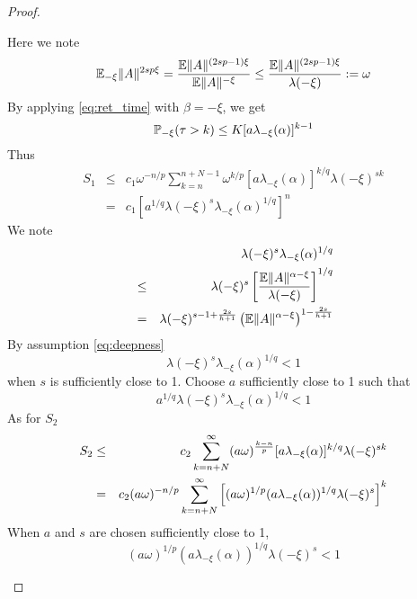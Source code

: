 \documentclass{article}
\theoremstyle{remark}
\begin{document}
\begin{proof}
\begin{enumerate}
\begin{enumerate}
      Here we note
      \begin{eqnarray*}
        \E_{-\xi} \|A\|^{2sp\xi} = {
          \E \|A\|^{(2sp-1)\xi}
          \over
          \E \|A\|^{-\xi}
        } \leq {
          \E \|A\|^{(2sp-1)\xi}
          \over
          \lambda(-\xi)
        } := \omega
      \end{eqnarray*}
      By applying \eqref{eq:ret_time} with $\beta = -\xi$, we get
      \[
      \P_{-\xi}(\tau > k) \leq K [a \lambda_{-\xi}(\alpha)]^{k-1}
      \]
      Thus
      \begin{eqnarray*}
        S_1 &\leq& c_1 \omega^{-n/p}
        \sum_{k=n}^{n+N-1} \omega^{k/p}
        [a \lambda_{-\xi}(\alpha)]^{k/q}
        \lambda(-\xi)^{sk} \\
        &=& c_1 \left[
          a^{1/q} \lambda(-\xi)^s \lambda_{-\xi}(\alpha)^{1/q}
        \right]^{n}
      \end{eqnarray*}
      We note
      \begin{eqnarray*}
        && \lambda(-\xi)^s \lambda_{-\xi}(\alpha)^{1/q}\\
        &\leq& \lambda(-\xi)^s \left[
          {
            \E \|A\|^{\alpha - \xi}
            \over
            \lambda(-\xi)
          }
        \right]^{1/q} \\
        &=& \lambda(-\xi)^{s - 1 + {2s \over h+1}} \left(
          \E \|A\|^{\alpha - \xi}
        \right)^{1 - {2s \over h+1}}
      \end{eqnarray*}
      By assumption \eqref{eq:deepness}
      \[
      \lambda(-\xi)^s \lambda_{-\xi}(\alpha)^{1/q} < 1
      \]
      when $s$ is sufficiently close to 1. Choose $a$ sufficiently
      close to 1 such that
      \begin{equation}
        \label{eq:S_1}
        a^{1/q} \lambda(-\xi)^s \lambda_{-\xi}(\alpha)^{1/q} < 1
      \end{equation}
      As for $S_2$
      \begin{eqnarray*}
        S_2 &\leq& c_2 \sum_{k=n+N}^\infty
        (a \omega)^{k-n \over p}
        [a \lambda_{-\xi}(\alpha)]^{k/q}
        \lambda(-\xi)^{sk} \\
        &=& c_2 (a \omega)^{-n/p}
        \sum_{k=n+N}^\infty \left[
          (a \omega)^{1/p}
          (a \lambda_{-\xi}(\alpha))^{1/q}
          \lambda(-\xi)^s
        \right]^k
      \end{eqnarray*}
      When $a$ and $s$ are chosen sufficiently close to 1,
      \[
          (a \omega)^{1/p}
          (a \lambda_{-\xi}(\alpha))^{1/q}
          \lambda(-\xi)^s < 1
\]
\end{enumerate}
\end{enumerate}
\end{proof}
\end{document}
